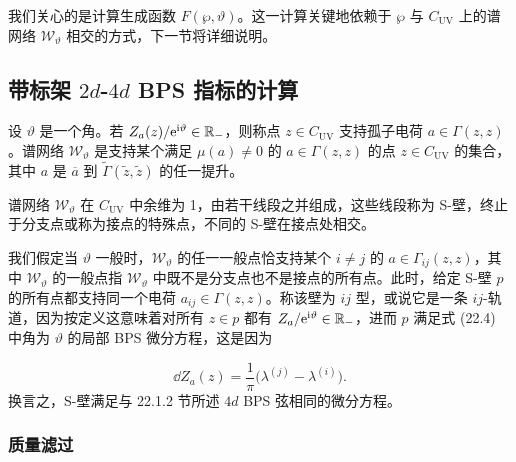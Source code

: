 我们关心的是计算生成函数 $F(\wp,\vartheta)$。这一计算关键地依赖于 $\wp$ 与 $C_{\mathrm{UV}}$ 上的谱网络 $\mathcal{W}_\vartheta$ 相交的方式，下一节将详细说明。

\subsection{带标架 $2d$-$4d$ BPS 指标的计算}

\begin{definition}[22.22]
设 $\vartheta$ 是一个角。若 $Z_a(z)/\mathrm{e}^{\mathrm{i}\vartheta}\in\mathbb{R}_-$，则称点 $z\in C_{\mathrm{UV}}$ 支持孤子电荷 $a\in\Gamma(z,z)$。谱网络 $\mathcal{W}_\vartheta$ 是支持某个满足 $\mu(a)\ne0$ 的 $a\in\Gamma(z,z)$ 的点 $z\in C_{\mathrm{UV}}$ 的集合，其中 $a$ 是 $\overline{a}$ 到 $\widetilde{\Gamma}(\widetilde{z},\widetilde{z})$ 的任一提升。
\end{definition}

\begin{proposition}[22.23]
谱网络 $\mathcal{W}_\vartheta$ 在 $C_{\mathrm{UV}}$ 中余维为 1，由若干线段之并组成，这些线段称为 S-壁，终止于分支点或称为接点的特殊点，不同的 S-壁在接点处相交。
\end{proposition}

我们假定当 $\vartheta$ 一般时，$\mathcal{W}_\vartheta$ 的任一一般点恰支持某个 $i\ne j$ 的 $a\in\Gamma_{ij}(z,z)$，其中 $\mathcal{W}_\vartheta$ 的一般点指 $\mathcal{W}_\vartheta$ 中既不是分支点也不是接点的所有点。此时，给定 S-壁 $p$ 的所有点都支持同一个电荷 $a_{ij}\in\Gamma(z,z)$。称该壁为 $ij$ 型，或说它是一条 $ij$-轨道，因为按定义这意味着对所有 $z\in p$ 都有 $Z_a/\mathrm{e}^{\mathrm{i}\vartheta}\in\mathbb{R}_-$，进而 $p$ 满足式 (22.4) 中角为 $\vartheta$ 的局部 BPS 微分方程，这是因为

\[
\dd Z_a(z)=\frac{1}{\pi}\big(\lambda^{(j)}-\lambda^{(i)}\big).
\]
换言之，S-壁满足与 22.1.2 节所述 $4d$ BPS 弦相同的微分方程。

\subsubsection*{质量滤过}

